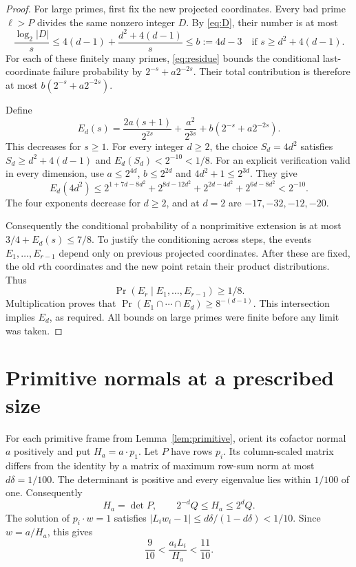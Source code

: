 \documentclass[11pt,a4paper]{article}
\theoremstyle{remark}
\newcommand{\dd}{\delta}
\begin{document}
\begin{proof}
For large primes, first fix the new projected coordinates.
Every bad prime \(\ell>P\) divides the same nonzero integer \(D\).
By \eqref{eq:D}, their number is at most
\[
 \frac{\log_2|D|}{s}
 \leq4(d-1)+\frac{d^2+4(d-1)}{s}
 \leq b:=4d-3
 \quad\text{if }s\geq d^2+4(d-1).
\]
For each of these finitely many primes, \eqref{eq:residue} bounds the
conditional last-coordinate failure probability by \(2^{-s}+a2^{-2s}\).
Their total contribution is therefore at most \(b(2^{-s}+a2^{-2s})\).

Define
\[
 E_d(s)=\frac{2a(s+1)}{2^{2s}}+\frac{a^2}{2^{3s}}
                  +b(2^{-s}+a2^{-2s}).          \tag{6}\label{eq:error}
\]
This decreases for \(s\geq1\).
For every integer \(d\geq2\), the choice \(S_d=4d^2\) satisfies
\(S_d\geq d^2+4(d-1)\) and \(E_d(S_d)<2^{-10}<1/8\).
For an explicit verification valid in every dimension, use
\(a\leq2^{4d}\), \(b\leq2^{2d}\) and \(4d^2+1\leq2^{3d}\).
They give
\[
 E_d(4d^2)\leq
 2^{1+7d-8d^2}+2^{8d-12d^2}
       +2^{2d-4d^2}+2^{6d-8d^2}<2^{-10}.
\]
The four exponents decrease for \(d\geq2\), and at \(d=2\)
are \(-17,-32,-12,-20\).

Consequently the conditional probability of a nonprimitive extension
is at most \(3/4+E_d(s)\leq7/8\).
To justify the conditioning across steps, the events
\(E_1,\ldots,E_{r-1}\) depend only on previous projected coordinates.
After these are fixed, the old \(r\)th coordinates and the new point
retain their product distributions. Thus
\[
 \Pr(E_r\mid E_1,\ldots,E_{r-1})\geq1/8.
\]
Multiplication proves that \(\Pr(E_1\cap\cdots\cap E_d)\geq8^{-(d-1)}\).
This intersection implies \(E_d\), as required.
All bounds on large primes were finite before any limit was taken.
\end{proof}

\section{Primitive normals at a prescribed size}
For each primitive frame from Lemma~\ref{lem:primitive}, orient its
cofactor normal \(a\) positively and put \(H_a=a\cdot p_1\).
Let \(P\) have rows \(p_i\). Its column-scaled matrix differs from the
identity by a matrix of maximum row-sum norm at most \(d\dd=1/100\).
The determinant is positive and every eigenvalue lies within \(1/100\)
of one. Consequently
\[
 H_a=\det P,\qquad 2^{-d}Q\leq H_a\leq2^dQ.
 \tag{7}\label{eq:heights}
\]
The solution of \(p_i\cdot w=1\) satisfies
\(\lvert L_iw_i-1\rvert\leq d\dd/(1-d\dd)<1/10\).
Since \(w=a/H_a\), this gives
\[
 \frac9{10}<\frac{a_iL_i}{H_a}<\frac{11}{10}.
 \tag{8}\label{eq:normalbox}
\]
\end{document}
